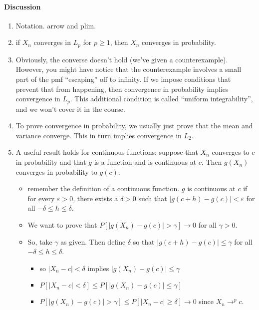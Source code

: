 \paragraph{Discussion}
\begin{enumerate}
\item Notation. arrow and plim.
\item if $X_n$ converges in $L_p$ for $p \geq 1$, then $X_n$
          converges in probability.
\item Obviously, the converse doesn't hold (we've given a
          counterexample).  However, you might have notice that the
          counterexample involves a small part of the pmf ``escaping'' off
          to infinity.  If we impose conditions that prevent that from
          happening, then convergence in probability implies convergence
          in $L_p$.  This additional condition is called ``uniform
          integrability'', and we won't cover it in the course.
\item To prove convergence in probability, we usually just prove that
          the mean and variance converge.  This in turn implies
          convergence in $L_2$.
\item A useful result holds for continuous functions: suppose that
          $X_n$ converges to $c$ in probability and that $g$ is a
          function and is continuous at $c$.  Then $g(X_n)$ converges in
          probability to $g(c)$.
\begin{itemize}
\item remember the definition of a continuous function.  $g$ is
              continuous at $c$ if for every $\varepsilon >0$, there
              exists a $\delta > 0$ such that $|g(c + h) - g(c)| <
              \varepsilon$ for all $-\delta \leq h \leq \delta$.
\item We want to prove that $P[|g(X_n) - g(c)| > \gamma]
              \to 0$ for all $\gamma > 0$.
\item So, take $\gamma$ as given.  Then define $\delta$ so that
              $|g(c + h) - g(c)| \leq \gamma$ for all $-\delta \leq h \leq \delta$.
\begin{itemize}
\item so $|X_n - c| < \delta$ implies $|g(X_n) - g(c)| \leq \gamma$
\item $P[|X_n - c| < \delta] \leq P[|g(X_n) - g(c)| \leq \gamma]$
\item $P[|g(X_n) - g(c)| > \gamma] \leq P[|X_n - c| \geq \delta] \to 0$ 
                since $X_n \to^p c$.

\end{itemize}
\end{itemize}
\end{enumerate}
